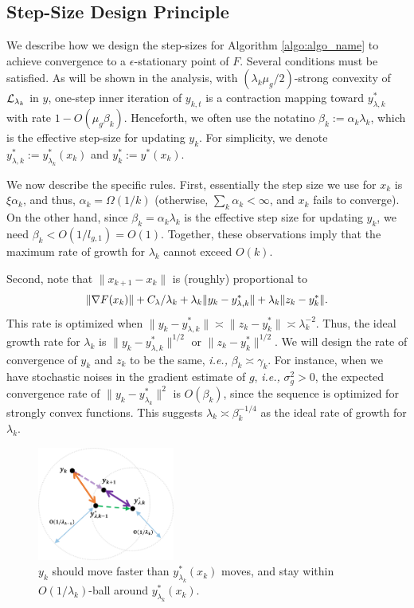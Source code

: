 \subsection{Step-Size Design Principle} 
\label{sec:step}



We describe how we design the step-sizes for Algorithm \ref{algo:algo_name} to  achieve convergence to a $\epsilon$-stationary point of $F$. 
Several conditions must be satisfied. 
As will be shown in the analysis, with $(\lambda_k \mu_g/2)$-strong convexity of $\mathcal{L}_{\lambda_k}$ in $y$, one-step inner iteration of $y_{k,t}$ is a contraction mapping toward $y_{\lambda,k}^*$ with rate $1 - O(\mu_g \beta_k)$. Henceforth, we often use the notatino $\beta_k := \alpha_k\lambda_k$, which is the effective step-size for updating $y_k$. 
For simplicity, we denote $y_{\lambda,k}^* := y_{\lambda_k}^* (x_k)$ and $y_k^* := y^*(x_k)$.  

We now describe the specific rules. First, essentially the step size we use for $x_k$ is $\xi \alpha_k$, and thus, $\alpha_k = \Omega(1/k)$ (otherwise, $\sum_k \alpha_k < \infty$, and $x_k$ fails to converge). 
On the other hand, since $\beta_k=\alpha_k\lambda_k$ is the effective step size for updating $y_k$, we need $\beta_k < O(1/l_{g,1}) = O(1)$. 
Together, these observations imply that the maximum rate of growth for $\lambda_k$ cannot exceed $O(k)$. 

Second, note that $\|x_{k+1} - x_k\|$ is (roughly) proportional to
\begin{align*}
    \|\nabla F(x_k)\| + C_\lambda/\lambda_k + \lambda_k \|y_k - y_{\lambda, k}^*\| + \lambda_k \|z_k - y_{k}^*\|.
\end{align*}
This rate is optimized when $\|y_{k} - y_{\lambda,k}^*\| \asymp \|z_k - y_k^*\| \asymp \lambda_k^{-2}$. Thus, the ideal growth rate for $\lambda_k$ is $\|y_{k} - y_{\lambda,k}^*\|^{1/2}$ or $\|z_k - y_k^*\|^{1/2}$. 
We will design the rate of convergence of $y_k$ and $z_k$ to be the same, {\it i.e.,} $\beta_k \asymp \gamma_k$. 
For instance, when we have stochastic noises in the gradient estimate of $g$, {\it i.e.,} $\sigma_g^2 > 0$, the expected convergence rate of $\|y_k - y_{\lambda_k}^*\|^2$ is $O(\beta_k)$, since the sequence is optimized for strongly convex functions. 
This suggests $\lambda_k \asymp \beta_k^{-1/4}$ as the ideal rate of growth for $\lambda_k$.




\begin{figure}[t]
    \centering
    \includegraphics[width=0.4\textwidth]{Figures/contraction_picture.png}
    \caption{$y_k$ should move faster than $y_{\lambda_k}^*(x_k)$ moves, and stay within $O(1/\lambda_k)$-ball around $y_{\lambda_k}^*(x_k)$.}
    \label{fig:contraction_explain}
\end{figure}

